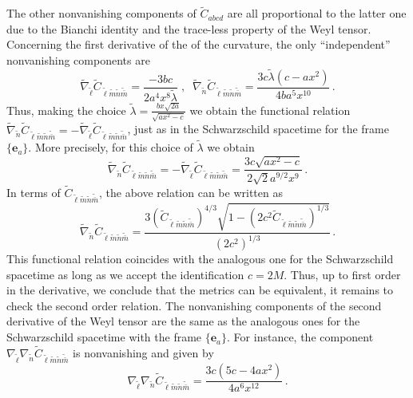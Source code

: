 \documentclass[twocolumn,prd,aps,showpacs,showkeys,amsmath,amssymb]{revtex4-1}
\newcommand{\bl}{\boldsymbol}
\begin{document}
The other nonvanishing components of $\tilde{C}_{abcd}$ are all proportional to the latter one due to the Bianchi identity and the trace-less property of the Weyl tensor. Concerning the first derivative of the of the curvature, the only ``independent'' nonvanishing components are
\begin{equation*}\label{gbfgf}
 \tilde{\nabla}_{\tilde{\ell}}   \tilde{C}_{\tilde{\ell} \tilde{m}  \tilde{n} \tilde{\bar{m}} } =  \frac{-3bc}{2 a^4 x^8 \tilde{\lambda}}
 \;,\;\; \tilde{\nabla}_{\tilde{n}}   \tilde{C}_{\tilde{\ell} \tilde{m}  \tilde{n} \tilde{\bar{m}} }  = \frac{3c \tilde{\lambda} ( c - a x^2)}{4 b a^5 x^{10} } \,.
\end{equation*}
Thus, making the choice $\tilde{\lambda} = \frac{bx\sqrt{2a}}{\sqrt{ax^2-c}}$ we obtain the functional relation $\tilde{\nabla}_{\tilde{n}}   \tilde{C}_{\tilde{\ell} \tilde{m}  \tilde{n} \tilde{\bar{m}} } =
-\tilde{\nabla}_{\tilde{\ell}}   \tilde{C}_{\tilde{\ell} \tilde{m}  \tilde{n} \tilde{\bar{m}} } $, just as in the Schwarzschild spacetime for the frame $\{\bl{e}_a\}$. More precisely, for this choice of $\tilde{\lambda}$ we obtain
\begin{equation*}\label{gbfgf}
 \tilde{\nabla}_{\tilde{n}}   \tilde{C}_{\tilde{\ell} \tilde{m}  \tilde{n} \tilde{\bar{m}} } =
  -\tilde{\nabla}_{\tilde{\ell}}   \tilde{C}_{\tilde{\ell} \tilde{m}  \tilde{n} \tilde{\bar{m}} }  =
  \frac{3c  \sqrt{ a x^2 - c}}{2 \sqrt{2} a^{9/2} x^{9} } \,.
\end{equation*}
In terms of $ \tilde{C}_{\tilde{\ell} \tilde{m}  \tilde{n} \tilde{\bar{m}}}$, the above relation can be written as
$$
\tilde{\nabla}_{\tilde{n}}   \tilde{C}_{\tilde{\ell} \tilde{m}  \tilde{n} \tilde{\bar{m}} } =
    \frac{3 (\tilde{C}_{\tilde{\ell} \tilde{m}  \tilde{n} \tilde{\bar{m}}})^{4/3}
   \sqrt{ 1- (2c^2 \tilde{C}_{\tilde{\ell} \tilde{m}  \tilde{n} \tilde{\bar{m}}})^{1/3}} }{(2 c^2)^{1/3} } \,.
 $$
This functional relation coincides with the analogous one for the Schwarzschild spacetime as long as we accept the identification $c=2M$. Thus, up to first order in the derivative, we conclude that the metrics can be equivalent, it remains to check the second order relation. The nonvanishing components of the second derivative of the Weyl tensor are the same as the analogous ones for the Schwarzschild spacetime with the frame $\{\bl{e}_a\}$. For instance, the component $ \nabla_{\tilde{\ell}} \nabla_{\tilde{n}}\tilde{C}_{\tilde{\ell} \tilde{m}  \tilde{n} \tilde{\bar{m}}}$ is nonvanishing and given by
$$
\nabla_{\tilde{\ell}} \nabla_{\tilde{n}}\tilde{C}_{\tilde{\ell} \tilde{m}  \tilde{n} \tilde{\bar{m}}} =
\frac{ 3c (5c - 4a x^2)  }{ 4 a^6 x^{12} }\,.
$$
\end{document}
